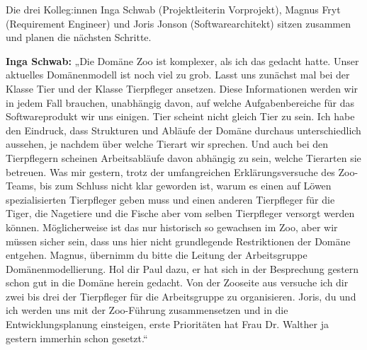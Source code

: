 Die drei Kolleg:innen Inga Schwab (Projektleiterin Vorprojekt), Magnus Fryt (Requirement Engineer) und Joris Jonson (Softwarearchitekt) sitzen zusammen und planen die nächsten Schritte.

\textbf{Inga Schwab:} „Die Domäne Zoo ist komplexer, als ich das gedacht hatte. Unser aktuelles Domänenmodell ist noch viel zu grob. Lasst uns zunächst mal bei der Klasse Tier und der Klasse Tierpfleger ansetzen. Diese Informationen werden wir in jedem Fall brauchen, unabhängig davon, auf welche Aufgabenbereiche für das Softwareprodukt wir uns einigen. Tier scheint nicht gleich Tier zu sein. Ich habe den Eindruck, dass Strukturen und Abläufe der Domäne durchaus unterschiedlich aussehen, je nachdem über welche Tierart wir sprechen. Und auch bei den Tier\-pflegern scheinen Arbeitsabläufe davon abhängig zu sein, welche Tierarten sie betreuen. Was mir gestern, trotz der umfangreichen Erklärungsversuche des Zoo-Teams, bis zum Schluss nicht klar geworden ist, warum es einen auf Löwen spezialisierten Tier\-pfleger geben muss und einen anderen Tierpfleger für die Tiger, die Nagetiere und die Fische aber vom selben Tierpfleger versorgt werden können. Möglicherweise ist das nur historisch so gewachsen im Zoo, aber wir müssen sicher sein, dass uns hier nicht grundlegende Restriktionen der Domäne entgehen. Magnus, übernimm du bitte die Leitung der Arbeitsgruppe Domänenmodellierung. Hol dir Paul dazu, er hat sich in der Besprechung gestern schon gut in die Domäne herein gedacht. Von der Zooseite aus versuche ich dir zwei bis drei der Tierpfleger für die Arbeitsgruppe zu organisieren. Joris, du und ich werden uns mit der Zoo-Führung zusammensetzen und in die Entwicklungsplanung einsteigen, erste Prioritäten hat Frau Dr. Walther ja gestern immerhin schon gesetzt.“

\cleardoubleevenemptypage 



\clearpage



\clearpage

\vspace*{4cm} %

